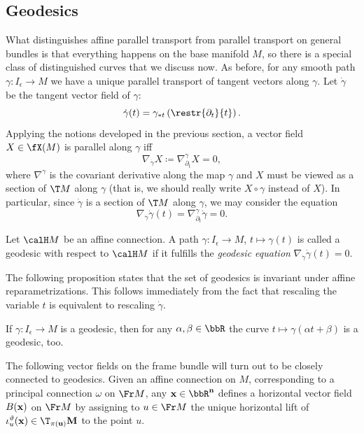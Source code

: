\subsection{Geodesics}


What distinguishes affine parallel transport from parallel transport on general bundles is that everything happens on the base manifold $M$, so there is a special class of distinguished curves that we discuss now. As before, for any smooth path $\gamma:I_\epsilon\to M$ we have a unique parallel transport of tangent vectors along $\gamma$. Let $\dot\gamma$ be the tangent vector field of $\gamma$:
\[\dot\gamma(t)=\gamma_{\ast t}\left(\restr{\partial_t}{t}\right).\]
Applying the notions developed in the previous section, a vector field $X\in \fX(M)$ is parallel along $\gamma$ iff 
\[\nabla_{\dot\gamma}X\coloneqq \nabla^\gamma_{\partial_t}X=0,\label{eq 2.1.34 RS2}\]
where $\nabla^\gamma$ is the covariant derivative along the map $\gamma$ and $X$ must be viewed as a section of $\T M$ along $\gamma$ (that is, we should really write $X\circ\gamma$ instead of $X$). In particular, since $\dot\gamma$ is a section of $\T M$ along $\gamma$, we may consider the equation 
\[\nabla_{\dot\gamma}\dot\gamma(t)=\nabla^\gamma_{\partial_t}\dot\gamma=0.\label{eq 2.1.35 RS2}\] 

\begin{defn}[Geodesic]
    Let $\calH M$ be an affine connection. A path $\gamma:I_\epsilon\to M$, $t\mapsto \gamma(t)$ is called a geodesic with respect to $\calH M$ if it fulfills the \emph{geodesic equation} $\nabla_{\dot\gamma}\dot\gamma(t)=0$.
\end{defn}

The following proposition states that the set of geodesics is invariant under affine reparametrizations. This follows immediately from the fact that rescaling the variable $t$ is equivalent to rescaling $\dot\gamma$.
\begin{prop}[{{\cite[Prop.~2.1.21]{RS2}}}]\label{prop 2.1.21 RS2}
    If $\gamma:I_\epsilon\to M$ is a geodesic, then for any $\alpha,\beta\in\bbR$ the curve $t\mapsto \gamma(\alpha t+\beta)$ is a geodesic, too.
\end{prop}


The following vector fields on the frame bundle will turn out to be closely connected to geodesics. Given an affine connection on $M$, corresponding to a principal connection $\omega$ on $\Fr M$, any $\bf{x}\in\bbR^n$ defines a horizontal vector field $B(\bf{x})$ on $\Fr M$ by assigning to $u\in\Fr M$ the unique horizontal lift of $\iota_u^\vartheta(\bf{x})\in \T_{\pi(u)}M$ to the point $u$.

